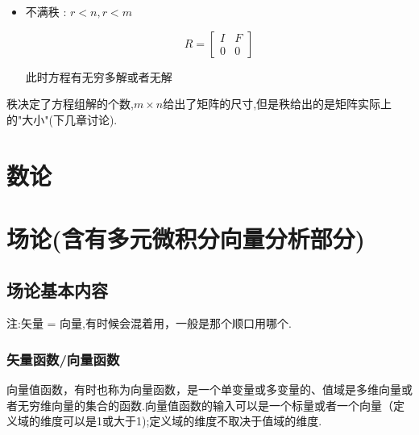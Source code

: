 \documentclass[UTF8,12pt]{ctexbook}
\begin{document}
{{{{{\begin{itemize}
{          此时矩阵可逆并且是个方阵.零空间只有零向量,无论$\vec{b}$取什么值,方程$A\vec{x} = \vec{b}$都有唯一解.
          $$
            \mbox{比如}A = \begin{bmatrix}
              1 & 2 \\
              3 & 1
            \end{bmatrix}
            \to
            \begin{bmatrix}
              1 & 0 \\
              0 & 1
            \end{bmatrix}
            =
            R
            =
            I
          $$
          }
    \item {
          不满秩 : $r < n, r < m$

          $$
            R = \begin{bmatrix}
              I & F \\
              0 & 0
            \end{bmatrix}
          $$

          此时方程有无穷多解或者无解
          }
  \end{itemize}

  秩决定了方程组解的个数,$m \times n$给出了矩阵的尺寸,但是秩给出的是矩阵实际上的"大小"(下几章讨论).
}%

}%

}%

\section{数论}{

 }%

\section{场论(含有多元微积分向量分析部分)}{

  \subsection{场论基本内容}{
    注:矢量 = 向量,有时候会混着用，一般是那个顺口用哪个.

    \subsubsection{矢量函数/向量函数}{
      向量值函数，有时也称为向量函数，是一个单变量或多变量的、值域是多维向量或者无穷维向量的集合的函数.向量值函数的输入可以是一个标量或者一个向量（定义域的维度可以是1或大于1);定义域的维度不取决于值域的维度.

}}}}}
\end{document}

